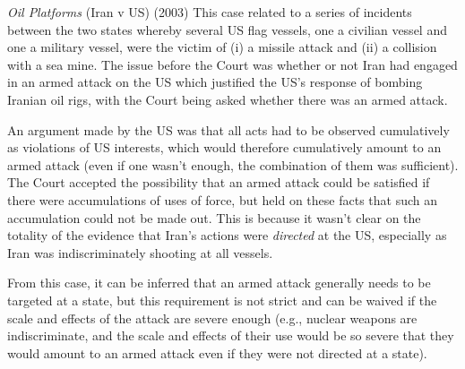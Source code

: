 \begin{casedetails}{\textit{Oil Platforms} (Iran v US) (2003)}
    \flushleft
    This case related to a series of incidents between the two states whereby several US flag vessels, one a civilian vessel and one a military vessel, were the victim of (i) a missile attack and (ii) a collision with a sea mine. The issue before the Court was whether or not Iran had engaged in an armed attack on the US which justified the US's response of bombing Iranian oil rigs, with the Court being asked whether there was an armed attack.

    \vspace{\baselineskip}

    An argument made by the US was that all acts had to be observed cumulatively as violations of US interests, which would therefore cumulatively amount to an armed attack (even if one wasn't enough, the combination of them was sufficient). The Court accepted the possibility that an armed attack could be satisfied if there were accumulations of uses of force, but held on these facts that such an accumulation could not be made out. This is because it wasn't clear on the totality of the evidence that Iran's actions were \textit{directed} at the US, especially as Iran was indiscriminately shooting at all vessels.

    \vspace{\baselineskip}

    From this case, it can be inferred that an armed attack generally needs to be targeted at a state, but this requirement is not strict and can be waived if the scale and effects of the attack are severe enough (e.g., nuclear weapons are indiscriminate, and the scale and effects of their use would be so severe that they would amount to an armed attack even if they were not directed at a state).
    
\end{casedetails}

